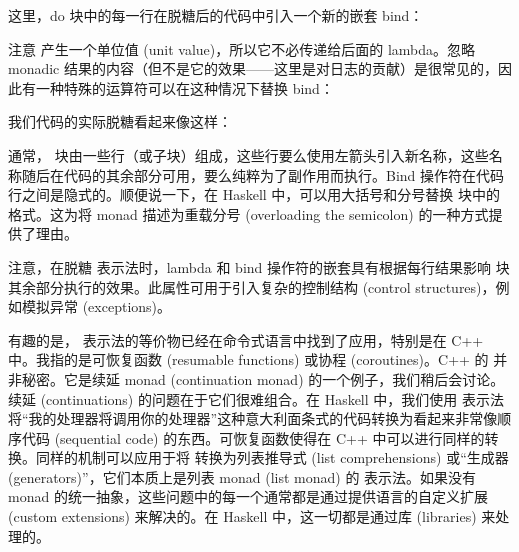 这里，do 块中的每一行在脱糖后的代码中引入一个新的嵌套 bind：

注意  产生一个单位值 (unit value)，所以它不必传递给后面的 lambda。忽略 monadic 结果的内容（但不是它的效果——这里是对日志的贡献）是很常见的，因此有一种特殊的运算符可以在这种情况下替换 bind：

我们代码的实际脱糖看起来像这样：

通常， 块由一些行（或子块）组成，这些行要么使用左箭头引入新名称，这些名称随后在代码的其余部分可用，要么纯粹为了副作用而执行。Bind 操作符在代码行之间是隐式的。顺便说一下，在 Haskell 中，可以用大括号和分号替换  块中的格式。这为将 monad 描述为重载分号 (overloading the semicolon) 的一种方式提供了理由。

注意，在脱糖  表示法时，lambda 和 bind 操作符的嵌套具有根据每行结果影响  块其余部分执行的效果。此属性可用于引入复杂的控制结构 (control structures)，例如模拟异常 (exceptions)。

有趣的是， 表示法的等价物已经在命令式语言中找到了应用，特别是在 C++ 中。我指的是可恢复函数 (resumable functions) 或协程 (coroutines)。C++ 的  并非秘密。它是续延 monad (continuation monad) 的一个例子，我们稍后会讨论。续延 (continuations) 的问题在于它们很难组合。在 Haskell 中，我们使用  表示法将“我的处理器将调用你的处理器”这种意大利面条式的代码转换为看起来非常像顺序代码 (sequential code) 的东西。可恢复函数使得在 C++ 中可以进行同样的转换。同样的机制可以应用于将  转换为列表推导式 (list comprehensions) 或“生成器 (generators)”，它们本质上是列表 monad (list monad) 的  表示法。如果没有 monad 的统一抽象，这些问题中的每一个通常都是通过提供语言的自定义扩展 (custom extensions) 来解决的。在 Haskell 中，这一切都是通过库 (libraries) 来处理的。